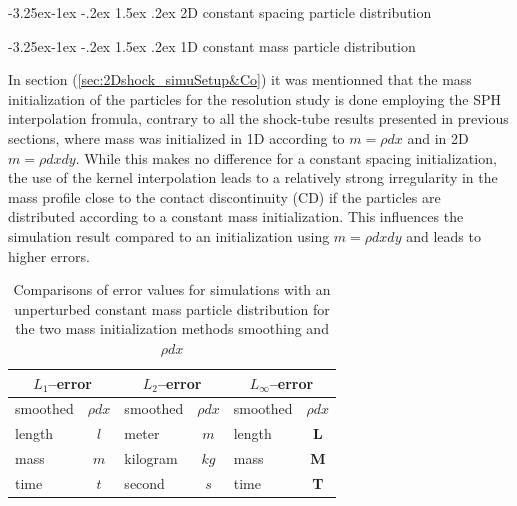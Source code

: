 \documentclass{report}
\makeatletter
\renewcommand\paragraph{\@startsection{paragraph}{4}{\z@}%
  {-3.25ex\@plus -1ex \@minus -.2ex}%
  {1.5ex \@plus .2ex}%
  {\normalfont\normalsize\bfseries}}
\makeatother
\begin{document}
\paragraph{2D constant spacing particle distribution}



\paragraph{1D constant mass particle distribution}

In section (\ref{sec:2Dshock_simuSetup&Co}) it was mentionned that the mass initialization of the particles for the resolution study is done employing the SPH interpolation fromula, contrary to all the shock-tube results presented in previous sections, where mass was initialized in 1D according to $m=\rho dx$ and in 2D $m=\rho dx dy$. While this makes no difference for a constant spacing initialization, the use of the 
kernel interpolation leads to a relatively strong irregularity in the mass profile close to the contact discontinuity (CD) if the particles are distributed according to a constant mass initialization. This  influences the simulation result compared to an initialization using $m=\rho dx dy$ and leads to higher errors.  

\begin{table}[h] %
\label{tab:2D_shock_m_smoothed_versus_rhodx}
\centering

\begin{tabular}[c]{|l| c|l| c|l| c|} %
\hline
\hline
\multicolumn{2}{|c|}{\textbf{$L_1$--error}} & \multicolumn{2}{|c|}{\textbf{$L_2$--error}} & \multicolumn{2}{|c|}{\textbf{$L_{\infty}$--error}}\\
\hline
smoothed & $\rho dx$ & smoothed & $\rho dx$& smoothed & $\rho dx$\\
\hline
\hline
length & $l$ & meter & $m$ & length & {\bf L}\\

mass & $m$ & kilogram & $kg$ & mass & {\bf M} \\

time & $t$ & second & $s$ & time & {\bf T}\\

\hline
\hline
\end{tabular}
\caption[]{Comparisons of error values for simulations with an unperturbed constant mass particle distribution for the two mass initialization methods smoothing and $\rho dx$}

\end{table}
\end{document}
